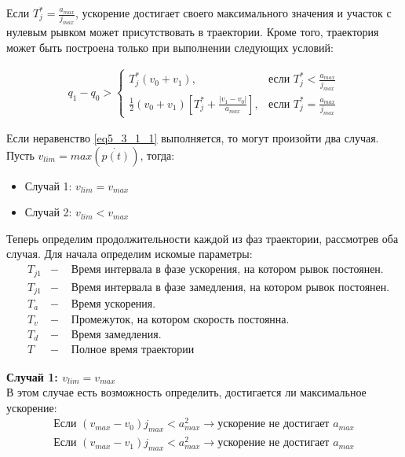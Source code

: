 	Если $T_{j}^{*} = \frac{a_{max}}{j_{max}}$, ускорение достигает своего максимального значения и участок с нулевым рывком может присутствовать в траектории. Кроме того, траектория может быть построена только при выполнении следующих условий:
	
	\begin{align} \label{eq5_3_1_1}
		q_{1} - q_{0} >
		\begin{cases}
			T_{j}^{*}(v_{0} + v_{1}),				&\text{если } T_{j}^{*} < \frac{a_{max}}{j_{max}}\\
			\frac{1}{2}(v_{0} + v_{1}) \left[ T_{j}^{*} + \frac{|v_{1} - v_{0}|}{a_{max}} \right],	&\text{если } T_{j}^{*} = \frac{a_{max}}{j_{max}}
		\end{cases}
	\end{align}

	Если неравенство \ref{eq5_3_1_1} выполняется, то могут произойти два случая. Пусть $v_{lim} = max(\dot{p(t)})$, тогда:
	\begin{itemize}
		\item Случай 1: $v_{lim} = v_{max}$
		\item Случай 2: $v_{lim} < v_{max}$
	\end{itemize}
	
	Теперь определим продолжительности каждой из фаз траектории, рассмотрев оба случая. Для начала определим искомые параметры:
	\begin{align*}
	&T_{j1}		&-	& \text{ Время интервала в фазе ускорения, на котором рывок постоянен.}\\
	&T_{j1}		&-	& \text{ Время интервала в фазе замедления, на котором рывок постоянен.}\\
	&T_{a}		&-	& \text{ Время ускорения.}\\
	&T_{v}		&-	& \text{ Промежуток, на котором скорость постоянна.}\\
	&T_{d}		&-	& \text{ Время замедления.}\\
	&T			&-	& \text{ Полное время траектории}
	\end{align*}

	\textbf{Случай 1: $v_{lim} = v_{max}$}\\
	В этом случае есть возможность определить, достигается ли максимальное ускорение:
	\begin{align}
		\text{Если } (v_{max} - v_{0})j_{max} < a_{max}^{2} \rightarrow \text{ускорение не достигает } a_{max} \label{eq5_3_1_2} \\		
		\text{Если } (v_{max} - v_{1})j_{max} < a_{max}^{2} \rightarrow \text{ускорение не достигает } a_{max} \label{eq5_3_1_3}
	\end{align}

